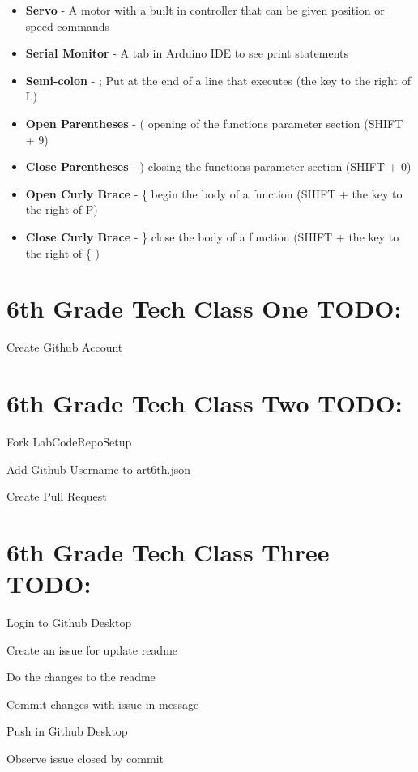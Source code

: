 \documentclass{article}
\begin{document}
\begin{itemize}
  \item \textbf{Servo} - A motor with a built in controller that can be given position or speed commands
  \item \textbf{Serial Monitor} - A tab in Arduino IDE to see print statements
  \item \textbf{Semi-colon} - ; Put at the end of a line that executes (the key to the right of L)
  \item \textbf{Open Parentheses} - ( opening of the functions parameter section (SHIFT + 9)
  \item \textbf{Close Parentheses} - ) closing the functions parameter section (SHIFT + 0)
  \item \textbf{Open Curly Brace} - \{ begin the body of a function (SHIFT + the key to the right of P)
  	\item \textbf{Close Curly Brace} - \} close the body of a function (SHIFT + the key to the right of \{ )
  
  
\end{itemize}

\newpage
\section{6th Grade Tech Class One TODO:}
\begin{todolist}
	\item Create Github Account
\end{todolist}


\section{6th Grade Tech Class Two TODO:}
\begin{todolist}
	\item Fork LabCodeRepoSetup
	\item Add Github Username to art6th.json
	\item Create Pull Request
\end{todolist}


\section{6th Grade Tech Class Three TODO:}
\begin{todolist}
	\item Login to Github Desktop
	\item Create an issue for update readme
	\item Do the changes to the readme
	\item Commit changes with issue in message
	\item Push in Github Desktop
	\item Observe issue closed by commit 
\end{todolist}
\end{document}
